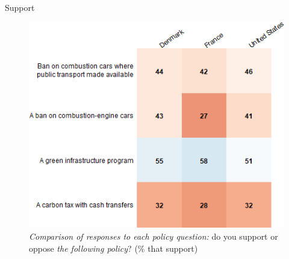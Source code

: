\documentclass[aspectratio=169,9pt,dvipsnames]{beamer}
\begin{document}


\begin{frame}{Support}%
\begin{figure}[h!]
\vspace{-.1cm}
\centering
\caption{\textit{Comparison of responses to each policy question:} do you support or oppose \textit{the following policy}? (\% that support)}
\includegraphics[width=.6\textwidth]{../figures/country_comparison/policies_all_support_positive_countries.png}
\end{figure}
\end{frame}


\end{document}
